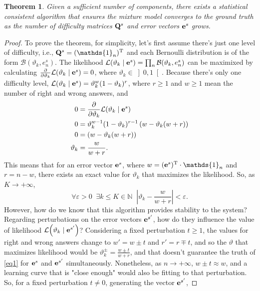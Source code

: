 \documentclass{article}
\newtheorem{theorem}{Theorem}
\newcommand{\0}{\mathbbold{0}}
\newcommand{\1}{\mathds{1}}
\newcommand{\2}{\mathbbold{2}}
\newcommand{\T}{^{\operatorname{T}}}
\newcommand{\Lh}[2]{\mathcal{L}\!\left(#1 \mid #2\right)}
\newcommand{\openinter}[2]{\left]#1,#2\right[}
\begin{document}
\begin{theorem}
    Given a sufficient number of components, there exists a statistical consistent algorithm that ensures the mixture model converges to the ground truth as the number of difficulty matrices ${\bf Q}^s$ and error vectors ${\bf e}^s$ grows.
\end{theorem}
\begin{proof}
    To prove the theorem, for simplicity, let's first assume there's just one level of difficulty, i.e., ${\bf Q}^s = (\1_n)\T$ and each Bernoulli distribution is of the form $\mathcal{B}(\vartheta_k, e^s_n)$.
    The likelihood $\Lh{\vartheta_k}{{\bf e}^s} = \prod_n \mathcal{B}(\vartheta_k, e^s_n)$ can be maximixed by calculating $\frac{\partial}{\partial \vartheta_k} \Lh{\vartheta_k}{{\bf e}^s} = 0 $, where $\vartheta_k \in \openinter{0}{1}$.
    Because there's only one difficulty level, $\Lh{\vartheta_k}{{\bf e}^s} = \vartheta_k^w(1-\vartheta_k)^r$, where $r \ge 1$ and $w \ge 1$ mean the number of right and wrong answers, and
    \begin{align*}
        0 &= \frac{\partial}{\partial \vartheta_k} \Lh{\vartheta_k}{{\bf e}^s} \\
        0 &= \vartheta_k^{w-1}(1-\vartheta_k)^{r-1}\left(w - \vartheta_k(w + r)\right) \\
        0 &= \left(w - \vartheta_k(w + r)\right) \\
        \vartheta_k &= \frac{w}{w+r}.
    \end{align*}
    This means that for an error vector ${\bf e}^s$, where $w = ({\bf e}^s)\T \cdot \1_n$ and $r = n - w$, there exists an exact value for $\vartheta_k$ that maximizes the likelihood.
    So, as $K \rightarrow +\infty$,
    \begin{equation}
        \forall \varepsilon > 0 \;\; \exists k \le K \in \mathbb{N} \;\; \left| \vartheta_k - \frac{w}{w+r} \right| < \varepsilon. \label{eq1}
    \end{equation}
    However, how do we know that this algorithm provides stability to the system? Regarding perturbations on the error vectors ${\bf e}^{s'}$, how do they influence the value of likelihood $\Lh{\vartheta_k}{{\bf e}^{s'}}$?
    Considering a fixed perturbation $t \ge 1$, the values for right and wrong answers change to $w' = w \pm t$ and $r' = r \mp t$, and so the $\vartheta$ that maximizes likelihood would be $\vartheta_k^\pm = \frac{w \pm t}{w+r}$,
    and that doesn't guarantee the truth of \eqref{eq1} for ${\bf e}^s$ and ${\bf e}^{s'}$ simultaneously.
    Nonetheless, as $n \rightarrow +\infty$, $w \pm t \approx w$, and a learning curve that is "close enough" would also be fitting to that perturbation. So, for a fixed perturbation $t \ne 0$, generating the vector ${\bf e}^{s'}$,

\end{proof}
\end{document}
